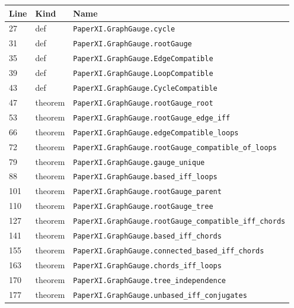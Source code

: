 \documentclass[10pt,oneside]{book}
\begin{document}
\begin{longtable}{@{}p{}p{}p{}@{}}\toprule Line&Kind&Name\\\midrule\endhead

27&def&\nolinkurl{PaperXI.GraphGauge.cycle}\\

31&def&\nolinkurl{PaperXI.GraphGauge.rootGauge}\\

35&def&\nolinkurl{PaperXI.GraphGauge.EdgeCompatible}\\

39&def&\nolinkurl{PaperXI.GraphGauge.LoopCompatible}\\

43&def&\nolinkurl{PaperXI.GraphGauge.CycleCompatible}\\

47&theorem&\nolinkurl{PaperXI.GraphGauge.rootGauge_root}\\

53&theorem&\nolinkurl{PaperXI.GraphGauge.rootGauge_edge_iff}\\

66&theorem&\nolinkurl{PaperXI.GraphGauge.edgeCompatible_loops}\\

72&theorem&\nolinkurl{PaperXI.GraphGauge.rootGauge_compatible_of_loops}\\

79&theorem&\nolinkurl{PaperXI.GraphGauge.gauge_unique}\\

88&theorem&\nolinkurl{PaperXI.GraphGauge.based_iff_loops}\\

101&theorem&\nolinkurl{PaperXI.GraphGauge.rootGauge_parent}\\

110&theorem&\nolinkurl{PaperXI.GraphGauge.rootGauge_tree}\\

127&theorem&\nolinkurl{PaperXI.GraphGauge.rootGauge_compatible_iff_chords}\\

141&theorem&\nolinkurl{PaperXI.GraphGauge.based_iff_chords}\\

155&theorem&\nolinkurl{PaperXI.GraphGauge.connected_based_iff_chords}\\

163&theorem&\nolinkurl{PaperXI.GraphGauge.chords_iff_loops}\\

170&theorem&\nolinkurl{PaperXI.GraphGauge.tree_independence}\\

177&theorem&\nolinkurl{PaperXI.GraphGauge.unbased_iff_conjugates}\\

\bottomrule\end{longtable}
\end{document}
